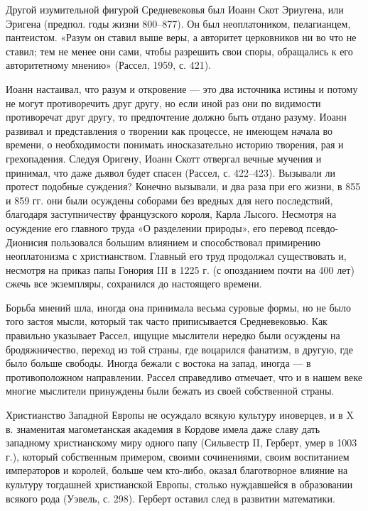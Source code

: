 Другой  изумительной фигурой  Средневековья был  Иоанн Скот  Эриугена,
или  Эригена (предпол.  годы  жизни 800--877).  Он был  неоплатоником,
пелагианцем,  пантеистом.  «Разум он  ставил  выше  веры, а  авторитет
церковников  ни  во что  не  ставил;  тем  не  менее они  сами,  чтобы
разрешить свои споры, обращались  к его авторитетному мнению» (Рассел,
1959, с. 421).

Иоанн настаивал, что разум и откровение --- это два источника истины и
потому не  могут противоречить  друг другу,  но если  иной раз  они по
видимости противоречат друг другу,  то предпочтение должно быть отдано
разуму. Иоанн  развивал и  представления о  творении как  процессе, не
имеющем  начала во  времени, о  необходимости понимать  иносказательно
историю  творения, рая  и  грехопадения. Следуя  Оригену, Иоанн  Скотт
отвергал  вечные мучения  и  принимал, что  даже  дьявол будет  спасен
(Рассел, с. 422--423). Вызывали  ли протест подобные суждения? Конечно
вызывали, и два раза при его жизни,  в 855 и 859 гг. они были осуждены
соборами без  вредных для  него последствий,  благодаря заступничеству
французского  короля,   Карла  Лысого.   Несмотря  на   осуждение  его
главного  труда «О  разделении природы»,  его перевод  псевдо-Дионисия
пользовался большим влиянием  и способствовал примирению неоплатонизма
с христианством.  Главный его труд продолжал  существовать и, несмотря
на приказ папы Гонория  III в 1225 г. (с опозданием  почти на 400 лет)
сжечь все экземпляры, сохранился до настоящего времени.

Борьба мнений  шла, иногда она  принимала весьма суровые формы,  но не
было того застоя мысли, который так часто приписывается Средневековью.
Как правильно указывает Рассел, ищущие мыслители нередко были осуждены
на бродяжничество,  переход из той  страны, где воцарился  фанатизм, в
другую, где  было больше  свободы. Иногда бежали  с востока  на запад,
иногда --- в противоположном направлении. Рассел справедливо отмечает,
что и  в нашем веке многие  мыслители принуждены были бежать  из своей
собственной страны.

Христианство Западной Европы не  осуждало всякую культуру иноверцев, и
в X  в. знаменитая магометанская  академия в Кордове имела  даже славу
дать западному христианскому миру  одного папу (Сильвестр II, Герберт,
умер  в 1003  г.), который  собственным примером,  своими сочинениями,
своим воспитанием  императоров и королей, больше  чем кто-либо, оказал
благотворное  влияние  на   культуру  тогдашней  христианской  Европы,
столько  нуждавшейся  в образовании  всякого  рода  (Уэвель, с.  298).
Герберт оставил след в развитии математики.

